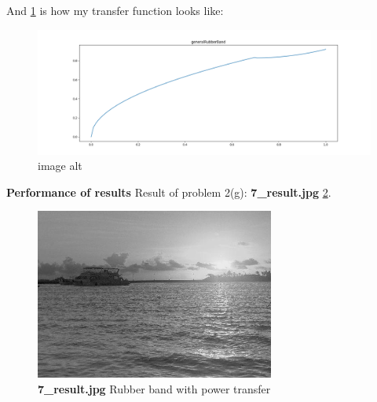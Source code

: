 And \cref{fig2g_T} is how my transfer function looks like:
\begin{figure}
\centering
\includegraphics[width=\textwidth]{image/prob2g_transfer_generalRubberBand.png}
\caption{image alt}
\label{fig2g_T}
\end{figure}

\textbf{Performance of results}
Result of problem 2(g): \textbf{7\_result.jpg} \cref{fig2g}.
\begin{figure}
    \centering
    \includegraphics[width=0.7\textwidth]{image/7_result.jpg}
    \caption{\textbf{7\_result.jpg} Rubber band with power transfer}
    \label{fig2g}
\end{figure}

